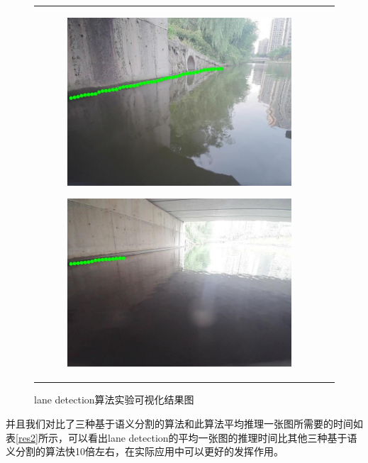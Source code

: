 \documentclass[cn,12pt,color=mine,scheme=chinese,bibstyle=gb7714-2015]{elegantbook}
\begin{document}
\begin{figure}[!htp]
\begin{tabular}{cc}
\begin{subfigure}[b]{0.23\linewidth}
			\centering\includegraphics[width=\linewidth]{lane/test3res}\caption{\label{lane2:c}}
		\end{subfigure}
		\begin{subfigure}[b]{0.23\linewidth}
			\centering\includegraphics[width=\linewidth]{lane/test4res}\caption{\label{lane2:d}}
		\end{subfigure}
	\end{tabular}
	\caption{lane detection算法实验可视化结果图}
	\label{lane-res}
\end{figure}

并且我们对比了三种基于语义分割的算法和此算法平均推理一张图所需要的时间如表\ref{res2}所示，可以看出lane detection的平均一张图的推理时间比其他三种基于语义分割的算法快10倍左右，在实际应用中可以更好的发挥作用。
\end{document}
